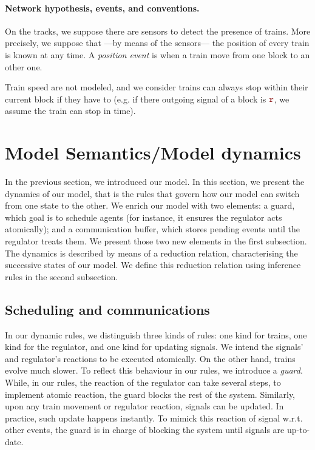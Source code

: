 \documentclass[runningheads]{llncs}
\newcommand{\sigred}{{\mbox{${\color{red!50!black}\mathtt{r}}$}}\xspace}
\begin{document}
\paragraph{Network hypothesis, events, and conventions.}
On the tracks, we suppose there are sensors to detect the presence of trains. More precisely, we suppose that ---by means of the sensors--- the position of every train is known at any time. A \emph{position event} is when a train move from one block to an other one. 

Train speed are not modeled, and we consider trains can always stop within their current block if they have to (e.g. if there outgoing signal of a block is \sigred, we assume the train can stop in time).


\section{Model Semantics/Model dynamics}
\label{sec:model_semantics}

In the previous section, we introduced our model. In this section, we present the dynamics of our model, that is the rules that govern how our model can switch from one state to the other.
We enrich our model with two elements: a guard, which goal is to schedule agents (for instance, it ensures the regulator acts atomically); and a communication buffer, which stores pending events until the regulator treats them. We present those two new elements in the first subsection.
The dynamics is described by means of a reduction relation, characterising the successive states of our model. We define this reduction relation using inference rules in the second subsection.


\subsection{Scheduling and communications}

In our dynamic rules, we distinguish three kinds of rules: one kind for trains, one kind for the regulator, and one kind for updating signals. We intend the signals' and regulator's reactions to be executed atomically. On the other hand, trains evolve much slower. To reflect this behaviour in our rules, we introduce a \emph{guard}. While, in our rules, the reaction of the regulator can take several steps, to implement atomic reaction, the guard blocks the rest of the system. Similarly, upon any train movement or regulator reaction, signals can be updated. In practice, such update happens instantly. To mimick this reaction of signal w.r.t. other events, the guard is in charge of blocking the system until signals are up-to-date.
\end{document}
